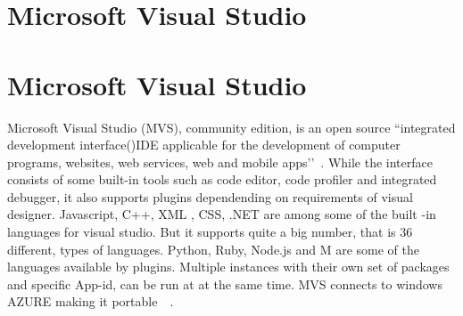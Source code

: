 \section{Microsoft Visual Studio}
\section{Microsoft Visual Studio}

Microsoft Visual Studio (MVS), community edition, is an open source ``integrated
development interface()IDE applicable for the development of computer programs, 
websites, web services, web and mobile apps’’~\cite{hid-sp18-415-www-wikipedia-org}. While 
the interface consists of some built-in tools such as code editor, code profiler
and integrated debugger, it also supports plugins dependending on  requirements 
of visual designer.  Javascript, C++, XML , CSS, .NET are among some of the 
built -in languages for visual studio. But it supports quite a big number, 
that is 36 different, types of languages. Python, Ruby, Node.js and M are 
some of the languages available by plugins.  Multiple instances with their own
set of packages and specific App-id, can be run at at the same time. MVS 
connects to windows AZURE making it portable~~\cite{hid-sp18-415-www-wikipedia-org}.
